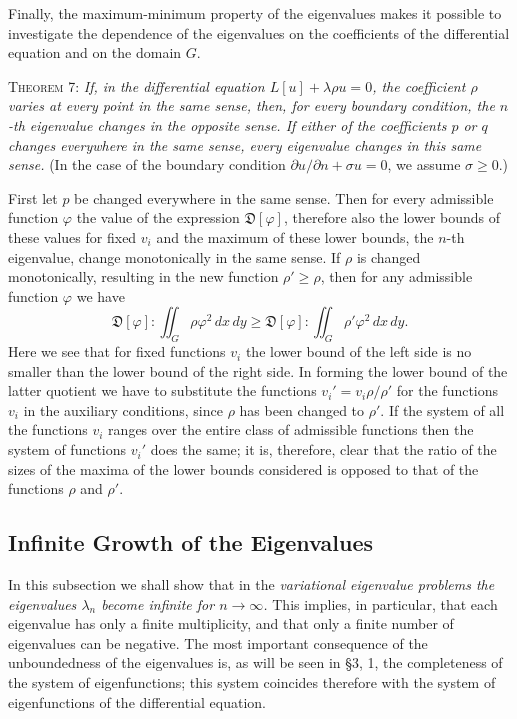 Finally, the maximum-minimum property of the eigenvalues makes it possible to investigate the dependence of the eigenvalues on the coefficients of the differential equation and on the domain $G$.

\textsc{Theorem 7:} \emph{If, in the differential equation $L[u]+\lambda\rho u=0$, the coefficient $\rho$ varies at every point in the same sense, then, for every boundary condition, the $n$-th eigenvalue changes in the opposite sense. If either of the coefficients $p$ or $q$ changes everywhere in the same sense, every eigenvalue changes in this same sense.} (In the case of the boundary condition $\partial u/\partial n+\sigma u=0$, we assume $\sigma\ge0$.)

First let $p$ be changed everywhere in the same sense. Then for every admissible function $\varphi$ the value of the expression $\mathfrak D[\varphi]$, therefore also the lower bounds of these values for fixed $v_i$ and the maximum of these lower bounds, the $n$-th eigenvalue, change monotonically in the same sense. If $\rho$ is changed monotonically, resulting in the new function $\rho'\ge\rho$, then for any admissible function $\varphi$ we have
\[
\mathfrak D[\varphi]:\iint_G\rho\varphi^2\,dx\,dy
\ge
\mathfrak D[\varphi]:\iint_G\rho'\varphi^2\,dx\,dy.
\]
Here we see that for fixed functions $v_i$ the lower bound of the left side is no smaller than the lower bound of the right side. In forming the lower bound of the latter quotient we have to substitute the functions $v_i'=v_i\rho/\rho'$ for the functions $v_i$ in the auxiliary conditions, since $\rho$ has been changed to $\rho'$. If the system of all the functions $v_i$ ranges over the entire class of admissible functions then the system of functions $v_i'$ does the same; it is, therefore, clear that the ratio of the sizes of the maxima of the lower bounds considered is opposed to that of the functions $\rho$ and $\rho'$.

\subsection{Infinite Growth of the Eigenvalues}
In this subsection we shall show that in the \emph{variational eigenvalue problems the eigenvalues $\lambda_n$ become infinite for $n\to\infty$.} This implies, in particular, that each eigenvalue has only a finite multiplicity, and that only a finite number of eigenvalues can be negative. The most important consequence of the unboundedness of the eigenvalues is, as will be seen in \S3, 1, the completeness of the system of eigenfunctions; this system coincides therefore with the system of eigenfunctions of the differential equation.

